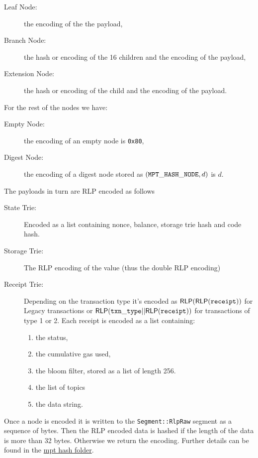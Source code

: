 \begin{description}
	\item[Leaf Node:] the encoding of the the payload,
	\item[Branch Node:] the hash or encoding of the 16 children and the encoding of the payload,
	\item[Extension Node:] the hash or encoding of the child and the encoding of the payload.
\end{description}
For the rest of the nodes we have:
\begin{description}
	\item[Empty Node:] the encoding of an empty node is {\tt 0x80},
	\item[Digest Node:] the encoding of a digest node stored as $({\tt MPT\_HASH\_NODE}, d)$ is $d$.
\end{description}

The payloads in turn are RLP encoded as follows
\begin{description}
	\item[State Trie:] Encoded as a list containing nonce, balance, storage trie hash and code hash.
	\item[Storage Trie:] The RLP encoding of the value (thus the double RLP encoding)
	\item[Receipt Trie:] Depending on the transaction type it's encoded as ${\sf RLP}({\sf RLP}({\tt receipt}))$ for Legacy transactions or ${\sf RLP}({\tt txn\_type}||{\sf RLP}({\tt receipt}))$ for transactions of type 1 or 2. Each receipt is encoded as a list containing:
	\begin{enumerate}
		\item the status,
		\item the cumulative gas used,
		\item the bloom filter, stored as a list of length 256.
		\item the list of topics
		\item the data string.
	\end{enumerate}
\end{description}

Once a node is encoded it is written to the {\tt Segment::RlpRaw} segment as a sequence of bytes. Then the RLP encoded data is hashed if the length of the data is more than 32 bytes. Otherwise we return the encoding. Further details can be found in the \href{https://github.com/0xPolygonZero/plonky2/tree/main/evm/src/cpu/mpt/hash}{mpt hash folder}.